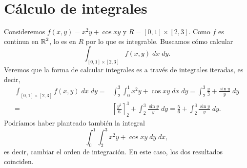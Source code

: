 \chapter{Cálculo de integrales}
\begin{eg}
	Consideremos $\displaystyle f\left(x,y\right) = x^{2}y + \cos xy $ y $\displaystyle R = \left[0,1\right] \times \left[2,3\right]  $. Como $\displaystyle f $ es continua en $\displaystyle \mathbb{R}^{2} $, lo es en $\displaystyle R $ por lo que es integrable. Buscamos cómo calcular
	\[\int _{\left[0,1\right] \times\left[2,3\right] }f\left(x,y\right) \; dx \; dy .\]
Veremos que la forma de calcular integrales es a través de integrales iteradas, es decir,
\[
\begin{split}
	\int _{\left[0,1\right] \times\left[2,3\right] }f\left(x,y\right) \; dx \; dy = & \int^{3}_{2} \int^{1}_{0} x^{2}y + \cos xy \; dx \; dy = \int^{3}_{2} \frac{y}{3} + \frac{\sin y}{y} \; dy \\
	= & \left[\frac{y^{2}}{6}\right]^{3}_{2} + \int^{3}_{2} \frac{\sin y}{y} \; dy= \frac{5}{6} + \int^{3}_{2} \frac{\sin y}{y} \; dy .
\end{split}
\]
Podríamos haber planteado también la integral
\[\int^{1}_{0} \int^{3}_{2} x^{2}y + \cos xy \; dy \; dx ,\]
es decir, cambiar el orden de integración. En este caso, los dos resultados coinciden.
\end{eg}
